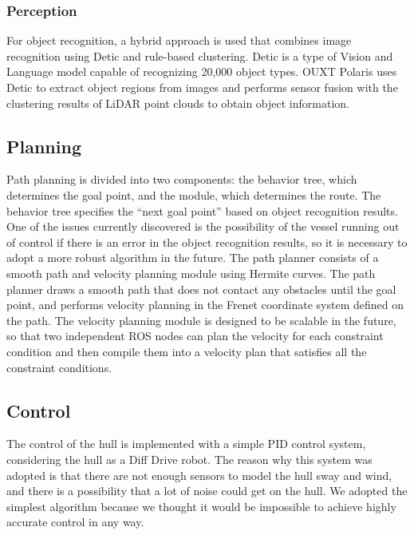 \documentclass[lettersize,journal]{IEEEtran}
\begin{document}
\subsubsection{Perception}

For object recognition, a hybrid approach is used that combines image recognition using Detic and rule-based clustering.
Detic is a type of Vision and Language model capable of recognizing 20,000 object types.
OUXT Polaris uses Detic to extract object regions from images and performs sensor fusion with the clustering results of LiDAR point clouds to obtain object information.

\subsection{Planning}

Path planning is divided into two components: the behavior tree, which determines the goal point, and the module, which determines the route.
The behavior tree specifies the “next goal point” based on object recognition results.
One of the issues currently discovered is the possibility of the vessel running out of control if there is an error in the object recognition results, so it is necessary to adopt a more robust algorithm in the future.
The path planner consists of a smooth path and velocity planning module using Hermite curves.
The path planner draws a smooth path that does not contact any obstacles until the goal point, and performs velocity planning in the Frenet coordinate system defined on the path.
The velocity planning module is designed to be scalable in the future, so that two independent ROS nodes can plan the velocity for each constraint condition and then compile them into a velocity plan that satisfies all the constraint conditions.

\subsection{Control}

The control of the hull is implemented with a simple PID control system, considering the hull as a Diff Drive robot.
The reason why this system was adopted is that there are not enough sensors to model the hull sway and wind, and there is a possibility that a lot of noise could get on the hull.
We adopted the simplest algorithm because we thought it would be impossible to achieve highly accurate control in any way.
\end{document}
